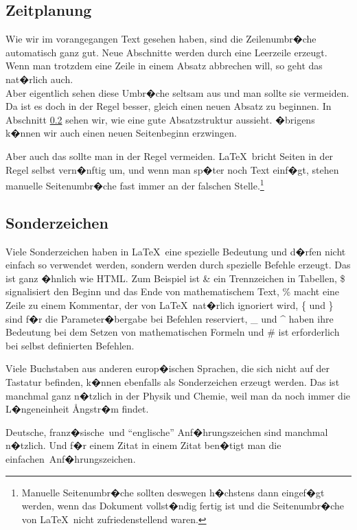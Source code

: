 \documentclass[11pt,a4paper]{article} %
\begin{document}
\subsection{Zeitplanung}
\label{Umbrueche}

Wie wir im vorangegangen Text gesehen haben, sind die Zeilenumbr�che automatisch ganz gut. Neue Abschnitte werden durch eine Leerzeile erzeugt. Wenn man trotzdem eine Zeile in einem Absatz abbrechen will, so geht das nat�rlich auch. \\  Aber eigentlich sehen diese Umbr�che seltsam aus und man sollte sie vermeiden. Da ist es doch in der Regel besser, gleich einen neuen Absatz zu beginnen. In Abschnitt \ref{Sonderzeichen} sehen wir, wie eine gute Absatzstruktur aussieht. �brigens k�nnen wir auch einen neuen Seitenbeginn erzwingen.

\newpage

Aber auch das sollte man in der Regel vermeiden. \LaTeX\ bricht Seiten in der Regel selbst vern�nftig um, und wenn man sp�ter noch Text einf�gt, stehen manuelle Seitenumbr�che fast immer an der falschen Stelle.\footnote{Manuelle Seitenumbr�che sollten deswegen h�chstens dann eingef�gt werden, wenn das Dokument vollst�ndig fertig ist und die Seitenumbr�che von \LaTeX\ nicht zufriedenstellend waren.}

\subsection{Sonderzeichen}
\label{Sonderzeichen}

Viele Sonderzeichen haben in \LaTeX\ eine spezielle Bedeutung und d�rfen nicht einfach so verwendet werden, sondern werden durch spezielle Befehle erzeugt. Das ist ganz �hnlich wie HTML. Zum Beispiel ist \& ein Trennzeichen in Tabellen, \$ signalisiert den Beginn und das Ende von mathematischem Text, \% macht eine Zeile zu einem Kommentar, der von \LaTeX\ nat�rlich ignoriert wird, \{ und \} sind f�r die Parameter�bergabe bei Befehlen reserviert, \_ und \^{} haben ihre Bedeutung bei dem Setzen von mathematischen Formeln und \# ist erforderlich bei selbst definierten Befehlen.

Viele Buchstaben aus anderen europ�ischen Sprachen, die sich nicht auf der Tastatur befinden, k�nnen ebenfalls als Sonderzeichen erzeugt werden. Das ist manchmal ganz n�tzlich in der Physik und Chemie, weil man da noch immer die L�ngeneinheit \AA ngstr�m findet. 

\glqq Deutsche\grqq, \flqq franz�sische\frqq\ und ``englische'' Anf�hrungszeichen sind manchmal n�tzlich. Und f�r einem Zitat in einem Zitat ben�tigt man die \glq einfachen\grq\ Anf�hrungszeichen. 
\end{document}
